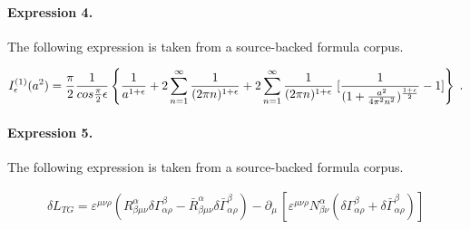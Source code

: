 \documentclass[11pt]{article}
\begin{document}
\paragraph{Expression 4.} The following expression is taken from a source-backed formula corpus.

\begin{align*}I^{(1)}_{\epsilon}(a^2)={{\pi}\over 2} {1\over {cos {{\pi}\over 2}\epsilon}}\left \{ {1\over {a^{1+ \epsilon}}}+ 2 \sum_{n=1}^{\infty} {1\over {(2 \pi n)^{1+\epsilon}}}+ 2\sum_{n=1}^{\infty} {1\over {(2 \pi n)^{1+\epsilon}}} \; [ {1\over {(1+ {{a^2}\over {4 \pi^2 n^2}})^{{1+\epsilon}\over 2}}} -1 ] \right \} \; .\end{align*}

\paragraph{Expression 5.} The following expression is taken from a source-backed formula corpus.

\begin{align*}\delta L_{TG}=\varepsilon^{\mu \nu\rho}(R_{\beta\mu \nu}^{\alpha}\delta \Gamma _{\alpha\rho}^{\beta}-\bar{R}_{\beta\mu\nu}^{\alpha }\delta\bar{\Gamma}_{\alpha \rho }^{\beta})-\partial_{\mu}\,[\varepsilon^{\mu\nu\rho}N_{\beta\nu}^{\alpha}(\delta\Gamma_{\alpha\rho}^{\beta}+\delta\bar{\Gamma}_{\alpha\rho}^{\beta})] \end{align*}
\end{document}
